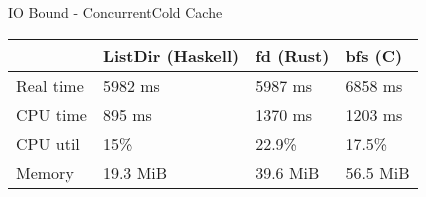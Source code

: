 \documentclass[17pt]{beamer}
\begin{document}
\begin{frame}{IO Bound - Concurrent}{Cold Cache}
\tiny

\begin{tabular}{|l|l|l|l|}
\hline
  & ListDir (Haskell)
  & fd (Rust)
  & bfs (C)
  \\
\hline
  Real time
  & 5982 ms
  & 5987 ms
  & 6858 ms
  \\
\hline
  CPU time
  & 895 ms
  & 1370 ms
  & 1203 ms
  \\
\hline
  CPU util
  & 15\%
  & 22.9\%
  & 17.5\%
  \\
\hline
  Memory
  & 19.3 MiB
  & 39.6 MiB
  & 56.5 MiB
  \\
\hline
\end{tabular}

\end{frame}

\end{document}
